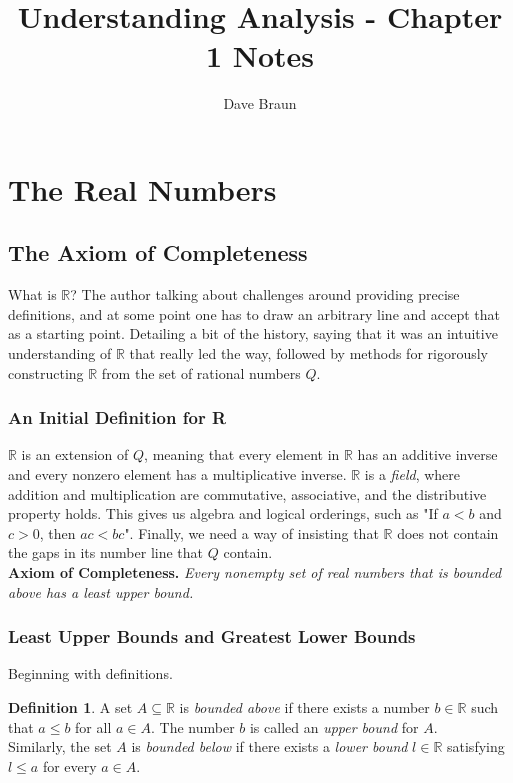 \documentclass{article}
\numberwithin{equation}{subsection}
\theoremstyle{definition}
\newtheorem{definition}{Definition}
\begin{document}
\title{Understanding Analysis - Chapter 1 Notes}
\author{Dave Braun}
\maketitle

\section{The Real Numbers}
\setcounter{subsection}{2}
\subsection{The Axiom of Completeness}

What is $\mathbb{R}$? The author talking about challenges around providing precise
definitions, and at some point one has to draw an arbitrary line and accept that as a
starting point. Detailing a bit of the history, saying that it was an intuitive
understanding of $\mathbb{R}$ that really led the way, followed by methods for rigorously
constructing $\mathbb{R}$ from the set of rational numbers $Q$.

\subsubsection{An Initial Definition for R}

$\mathbb{R}$ is an extension of $Q$, meaning that every element in $\mathbb{R}$ has an
additive inverse and every nonzero element has a multiplicative inverse. $\mathbb{R}$ is a
\emph{field}, where addition and multiplication are commutative, associative, and the
distributive property holds. This gives us algebra and logical orderings, such as "If $a <
b$ and $c > 0$, then $ac < bc$". Finally, we need a way of insisting that $\mathbb{R}$
does not contain the gaps in its number line that $Q$ contain. \\

\textbf{Axiom of Completeness.} \emph{Every nonempty set of real numbers that is bounded
above has a least upper bound.}


\subsubsection{Least Upper Bounds and Greatest Lower Bounds}

Beginning with definitions.

\begin{definition}
    A set $A \subseteq \mathbb{R}$ is \emph{bounded above} if there exists a number $b \in
    \mathbb{R}$ such that $a \leq b$ for all $a \in A$. The number $b$ is called an
    \emph{upper bound} for $A$. \\
    Similarly, the set $A$ is \emph{bounded below} if there exists a \emph{lower bound} $l
    \in \mathbb{R}$ satisfying $l \leq a$ for every $a \in A$.

\end{definition}
\end{document}
